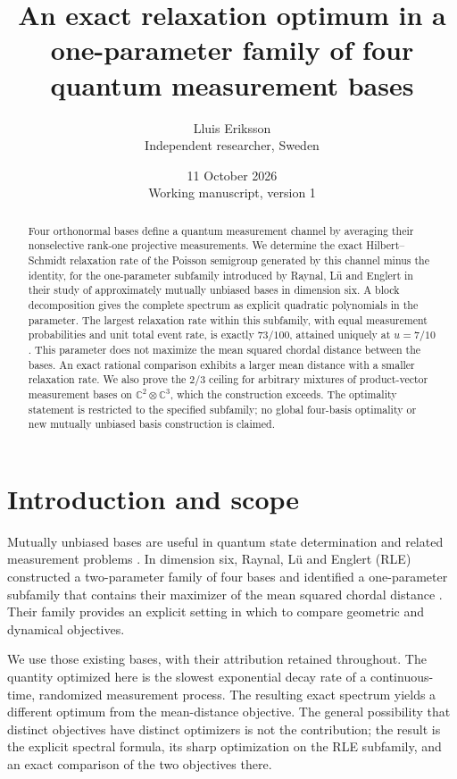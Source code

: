 \documentclass[11pt,a4paper]{article}
\title{An exact relaxation optimum in a one-parameter family of four quantum measurement bases}
\author{Lluis Eriksson\\\small Independent researcher, Sweden}
\date{11 October 2026\\\small Working manuscript, version 1}
\theoremstyle{remark}
\newcommand{\C}{\mathbb C}
\begin{document}
\maketitle
\begin{abstract}
Four orthonormal bases define a quantum measurement channel by averaging their nonselective rank-one projective measurements. We determine the exact Hilbert--Schmidt relaxation rate of the Poisson semigroup generated by this channel minus the identity, for the one-parameter subfamily introduced by Raynal, L\"u and Englert in their study of approximately mutually unbiased bases in dimension six. A block decomposition gives the complete spectrum as explicit quadratic polynomials in the parameter. The largest relaxation rate within this subfamily, with equal measurement probabilities and unit total event rate, is exactly $73/100$, attained uniquely at $u=7/10$. This parameter does not maximize the mean squared chordal distance between the bases. An exact rational comparison exhibits a larger mean distance with a smaller relaxation rate. We also prove the $2/3$ ceiling for arbitrary mixtures of product-vector measurement bases on $\C^2\otimes\C^3$, which the construction exceeds. The optimality statement is restricted to the specified subfamily; no global four-basis optimality or new mutually unbiased basis construction is claimed.
\end{abstract}

\section{Introduction and scope}
Mutually unbiased bases are useful in quantum state determination and related measurement problems \cite{wootters,zhu}. In dimension six, Raynal, L\"u and Englert (RLE) constructed a two-parameter family of four bases and identified a one-parameter subfamily that contains their maximizer of the mean squared chordal distance \cite{rle}. Their family provides an explicit setting in which to compare geometric and dynamical objectives.

We use those existing bases, with their attribution retained throughout. The quantity optimized here is the slowest exponential decay rate of a continuous-time, randomized measurement process. The resulting exact spectrum yields a different optimum from the mean-distance objective. The general possibility that distinct objectives have distinct optimizers is not the contribution; the result is the explicit spectral formula, its sharp optimization on the RLE subfamily, and an exact comparison of the two objectives there.
\end{document}
